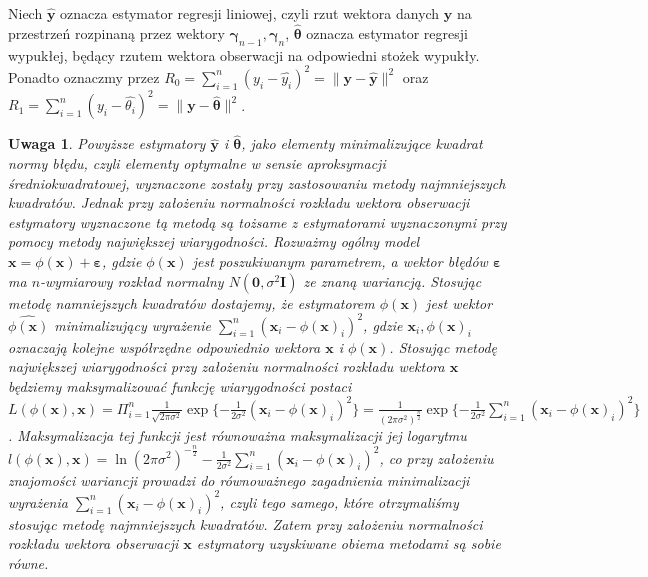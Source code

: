 \documentclass[12pt]{mwart}
\newtheorem{uw}{Uwaga}
\begin{document}
Niech $\hat{\pmb{y}}$ oznacza estymator regresji liniowej, czyli rzut wektora danych $\pmb{y}$ na przestrzeń rozpinaną przez wektory $\pmb{\gamma}_{n-1},\pmb{\gamma}_n$, $\hat{\pmb{\theta}}$ oznacza estymator regresji wypukłej, będący rzutem wektora obserwacji na odpowiedni stożek wypukły. Ponadto oznaczmy przez $R_0=\sum_{i=1}^n{(y_i-\hat{y_i})^2}=\|\pmb{y}-\hat{\pmb{y}}\|^2$ oraz $R_1=\sum_{i=1}^n{(y_i-\hat{\theta_i})^2}=\|\pmb{y}-\hat{\pmb{\theta}}\|^2$. 
\begin{uw}\label{uwaga}
Powyższe estymatory $\hat{\pmb{y}}$ i $\hat{\pmb{\theta}}$, jako elementy minimalizujące kwadrat normy błędu, czyli elementy optymalne w sensie aproksymacji średniokwadratowej, wyznaczone zostały przy zastosowaniu metody najmniejszych kwadratów. Jednak przy założeniu normalności rozkładu wektora obserwacji estymatory wyznaczone tą metodą są tożsame z estymatorami wyznaczonymi przy pomocy metody największej wiarygodności. Rozważmy ogólny model $\pmb{x}=\phi(\pmb{x})+\pmb{\varepsilon}$, gdzie $\phi(\pmb{x})$ jest poszukiwanym parametrem, a wektor błędów $\pmb{\varepsilon}$ ma $n$-wymiarowy rozkład normalny $N(\pmb{0},\sigma^2\pmb{I})$ ze znaną wariancją. Stosując metodę namniejszych kwadratów dostajemy, że estymatorem $\phi(\pmb{x})$ jest wektor $\hat{\phi(\pmb{x})}$ minimalizujący wyrażenie $\sum_{i=1}^n(\pmb{x}_i-\phi(\pmb{x})_i)^2$, gdzie $\pmb{x}_i,\phi(\pmb{x})_i$ oznaczają kolejne współrzędne odpowiednio wektora $\pmb{x}$ i $\phi(\pmb{x})$. Stosując metodę największej wiarygodności przy założeniu normalności rozkładu wektora $\pmb{x}$ będziemy maksymalizować funkcję wiarygodności postaci $L(\phi(\pmb{x}),\pmb{x})=\Pi_{i=1}^n\frac{1}{\sqrt{2\pi \sigma^2}}\exp\{-\frac{1}{2\sigma^2}(\pmb{x}_i-\phi(\pmb{x})_i)^2\}=\frac{1}{(2\pi \sigma^2)^{\frac{n}{2}}}\exp\{-\frac{1}{2\sigma^2}\sum_{i=1}^n(\pmb{x}_i-\phi(\pmb{x})_i)^2\}$. Maksymalizacja tej funkcji jest równoważna maksymalizacji jej logarytmu $l(\phi(\pmb{x}),\pmb{x})=\ln (2\pi \sigma^2)^{-\frac{n}{2}}-\frac{1}{2\sigma^2}\sum_{i=1}^n(\pmb{x}_i-\phi(\pmb{x})_i)^2$, co przy założeniu znajomości wariancji prowadzi do równoważnego zagadnienia minimalizacji wyrażenia $\sum_{i=1}^n(\pmb{x}_i-\phi(\pmb{x})_i)^2$, czyli tego samego, które otrzymaliśmy stosując metodę najmniejszych kwadratów. Zatem przy założeniu normalności rozkładu wektora obserwacji $\pmb{x}$ estymatory uzyskiwane obiema metodami są sobie równe.
\end{uw}
\end{document}

